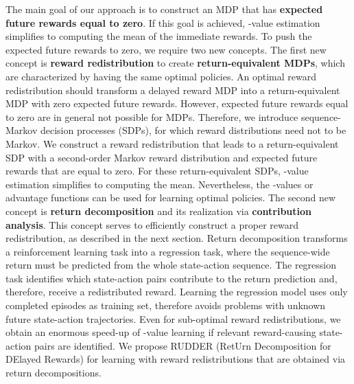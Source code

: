 \documentclass{article}
\begin{document}
The main goal of our approach is 
to construct an MDP that has {\bf expected future rewards equal to zero}. 
If this goal is achieved, 
-value estimation simplifies to computing the mean of the immediate rewards.
To push the expected future rewards to zero, we require two new concepts.
The first new concept is {\bf reward redistribution} to create {\bf return-equivalent MDPs}, 
which are characterized by having the same optimal policies. 
An optimal reward redistribution should transform a delayed reward MDP into  
a return-equivalent MDP with zero expected future rewards.
However, expected future rewards equal to zero are in general not possible for MDPs.
Therefore, we introduce sequence-Markov decision processes (SDPs),
for which reward distributions need not to be Markov.
We construct a reward redistribution that leads to a return-equivalent
SDP with a second-order Markov reward distribution and 
expected future rewards that are equal to zero.
For these return-equivalent 
SDPs, -value estimation simplifies to computing the mean. 
Nevertheless, the -values or advantage functions 
can be used for learning optimal policies.
The second new concept is
{\bf return decomposition} and its realization via {\bf contribution analysis}.
This concept serves to efficiently construct a proper reward redistribution,
as described in the next section.
Return decomposition transforms a reinforcement learning task 
into a regression task, where the sequence-wide 
return must be predicted from the whole state-action sequence.
The regression task identifies which state-action pairs
contribute to the return prediction and, therefore, receive a redistributed reward. 
Learning the regression model uses only completed episodes as training set,
therefore avoids problems with unknown future state-action trajectories.
Even for sub-optimal reward redistributions, we obtain an enormous speed-up
of -value learning if relevant reward-causing state-action pairs are identified.
We propose RUDDER (RetUrn Decomposition for DElayed Rewards) for learning with 
reward redistributions that are obtained via return decompositions.
\end{document}
